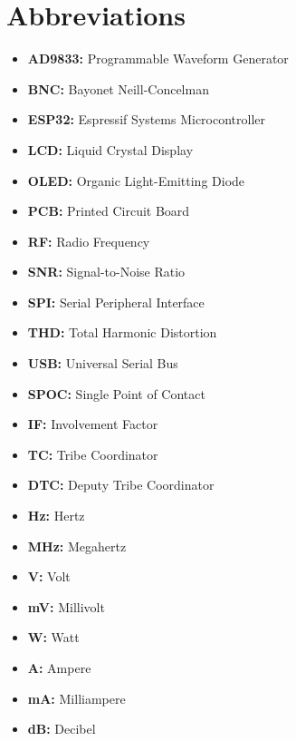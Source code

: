 \documentclass[a4paper,12pt]{article}
\begin{document}



\newpage
\section{Abbreviations}
\begin{itemize}

\item \textbf{AD9833:} Programmable Waveform Generator
\item \textbf{BNC:} Bayonet Neill-Concelman
\item \textbf{ESP32:} Espressif Systems Microcontroller
\item \textbf{LCD:} Liquid Crystal Display
\item \textbf{OLED:} Organic Light-Emitting Diode
\item \textbf{PCB:} Printed Circuit Board
\item \textbf{RF:} Radio Frequency
\item \textbf{SNR:} Signal-to-Noise Ratio
\item \textbf{SPI:} Serial Peripheral Interface
\item \textbf{THD:} Total Harmonic Distortion
\item \textbf{USB:} Universal Serial Bus

\item \textbf{SPOC:} Single Point of Contact
\item \textbf{IF:} Involvement Factor
\item \textbf{TC:} Tribe Coordinator
\item \textbf{DTC:} Deputy Tribe Coordinator

\item \textbf{Hz:} Hertz
\item \textbf{MHz:} Megahertz
\item \textbf{V:} Volt
\item \textbf{mV:} Millivolt
\item \textbf{W:} Watt
\item \textbf{A:} Ampere
\item \textbf{mA:} Milliampere
\item \textbf{dB:} Decibel


\end{itemize}
\end{document}

